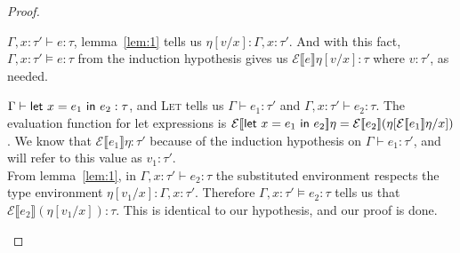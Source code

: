 \begin{proof}
\begin{description}
    $\Gamma, x : \tau' \vdash e : \tau$, lemma~\ref{lem:1} tells us $\eta[v/x] : \Gamma,x : \tau'$.
    And with this fact, $\Gamma,x : \tau' \vDash e : \tau$ from the
    induction hypothesis gives us $\mathcal{E} \llbracket e \rrbracket \eta [v/x] : \tau$
    where $v : \tau'$, as needed.
  \item[\boxed{\letin{x = e_1}{e_2}}] $\Gamma \vdash \mathsf{let} \ x = e_1 \ \mathsf{in} \ e_2 : \tau$, and
    \textsc{Let} tells us $\Gamma \vdash e_1 : \tau'$ and $\Gamma,x : \tau' \vdash e_2 : \tau$. The
    evaluation function for let expressions is
    ${\mathcal{E} [\![ \mathsf{let} \ x = e_1 \ \mathsf{in} \ e_2 ]\!] \eta
    = \mathcal{E} [\![ e_2 ]\!] (\eta [\mathcal{E} [\![ e_1 ]\!] \eta / x ])}$. We know that
  $\mathcal{E} \llbracket e_1 \rrbracket \eta : \tau'$ because of the induction hypothesis on
  $\Gamma \vdash e_1 : \tau'$, and will refer to this value as $v_1 : \tau'$. \\
  From lemma~\ref{lem:1}, in $\Gamma,x : \tau' \vdash e_2 : \tau$ the substituted environment
  respects the type environment $\eta[v_1/x] : \Gamma,x : \tau'$.
  Therefore $\Gamma,x : \tau' \vDash e_2 : \tau$ tells us that
  $\mathcal{E} \llbracket e_2 \rrbracket (\eta [v_1/x]) : \tau$. This is
  identical to our hypothesis, and our proof is done.
  \end{description}
  
\end{proof}

